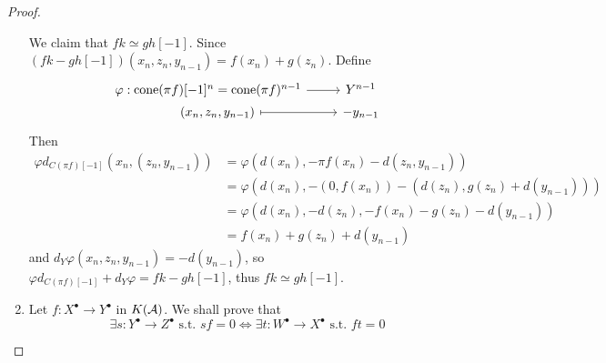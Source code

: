 \begin{theorem}
\begin{proof}
\begin{enumerate}
        We claim that $fk \simeq g h[-1]$. Since $(fk - gh[-1])(x_n, z_n, y_{n-1})
        = f(x_n) + g(z_n)$. Define
        \[ \begin{tikzcd}[row sep=0]
            \varphi: &[-3em] \cone(\pi f)[-1]^n = \cone(\pi f)^{n-1} \ar[r] & Y^{n-1} \\
                     &[-3em] (x_n, z_n, y_{n-1}) \ar[r, mapsto] & -y_{n-1}
          \end{tikzcd} \]
        Then
        \begin{align*}
          \varphi d_{C(\pi f)[-1]}(x_n, (z_n, y_{n-1}))
          &= \varphi (d(x_n), - \pi f(x_n) - d(z_n, y_{n-1})) \\
          &= \varphi (d(x_n), - (0, f(x_n)) - (d(z_n), g(z_n) + d(y_{n-1}))) \\
          &= \varphi (d(x_n), - d(z_n),  - f(x_n) - g(z_n) - d(y_{n-1})) \\
          &= f(x_n) + g(z_n) + d(y_{n-1})
        \end{align*}
        and $d_Y \varphi(x_n, z_n, y_{n-1}) = -d(y_{n-1})$,
        so $\varphi d_{C(\pi f)[-1]} + d_Y \varphi = fk - gh[-1]$, thus
        $fk \simeq gh[-1]$.
      \item Let $f : X^\bullet \to Y^\bullet$ in $K(\mathcal{A})$. We shall prove that
        \[ \exists s: Y^\bullet \to Z^\bullet \text{ s.t. } sf = 0
          \iff \exists t: W^\bullet \to X^\bullet \text{ s.t. } ft = 0 \]


\end{enumerate}
\end{proof}
\end{theorem}
